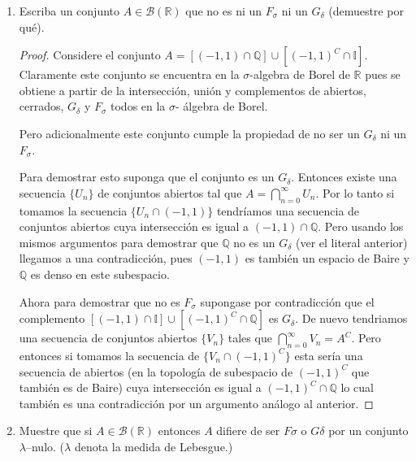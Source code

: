 \documentclass[letter,twoside,12pt]{article}
\numberwithin{equation}{section}
\begin{document}
\begin{enumerate}[label = (\textbf{\arabic*.})]
\begin{enumerate}[label = (\textbf{\roman*.})]
\begin{proof}
Sin embargo, si tomo la intersección de las dos colecciones su resultado es vacío y esto contradice el hecho que $ \mathbb{R} $ es un espacio de Baire.

\end{proof}

\item Escriba un conjunto $ A \in \mathcal{B}(\mathbb{R}) $ que no es ni un $ F_\sigma $ ni un $ G_\delta $ (demuestre por qué).
\begin{proof}
Considere el conjunto $A = [(-1,1) \cap \mathbb{Q}] \cup [(-1,1)^C \cap \mathbb{I}]$. Claramente este conjunto se encuentra en la $ \sigma $-algebra de Borel de $\mathbb{R}$ pues se obtiene a partir de la intersección, unión y complementos de abiertos, cerrados, $G_\delta$ y $F_\sigma $ todos en la $ \sigma $- álgebra de Borel.

Pero adicionalmente este conjunto cumple la propiedad de no ser un $G_\delta$ ni un $F_\sigma$.

Para demostrar esto suponga que el conjunto es un $ G_\delta $. Entonces existe una secuencia $ \{U_n\} $ de conjuntos abiertos tal que $ A = \bigcap_{n=0}^\infty U_n $. Por lo tanto si tomamos la secuencia $\{U_n \cap (-1,1)\}$ tendríamos una secuencia de conjuntos abiertos cuya intersección es igual a $ (-1,1) \cap \mathbb{Q} $. Pero usando los mismos argumentos para demostrar que $\mathbb{Q}$ no es un $G_\delta$ (ver el literal anterior) llegamos a una contradicción, pues $(-1,1) $ es también un espacio de Baire y $ \mathbb{Q} $ es denso en este subespacio.

Ahora para demostrar que no es $ F_\sigma $ supongase por contradicción que el complemento $ [(-1,1) \cap \mathbb{I}] \cup [(-1,1)^C \cap \mathbb{Q}] $ es $ G_\delta $. De nuevo tendriamos una secuencia de conjuntos abiertos $\{V_n\}$ tales que $\bigcap_{n=0}^\infty V_n = A^C$. Pero entonces si tomamos la secuencia de $\{V_n \cap (-1,1)^C\}$ esta sería una secuencia de abiertos (en la topología de subespacio de $ (-1,1)^C $ que también es de Baire) cuya intersección es igual a $ (-1,1)^C  \cap \mathbb{Q}$ lo cual también es una contradicción por un argumento análogo al anterior.

\end{proof}

\item Muestre que si $ A \in \mathcal{B}(\mathbb{R}) $ entonces $ A $ difiere de ser $ F\sigma $ o $ G\delta $ por un conjunto $ \lambda $–nulo. ($ \lambda $
denota la medida de Lebesgue.)


\end{enumerate}
\end{enumerate}
\end{document}
